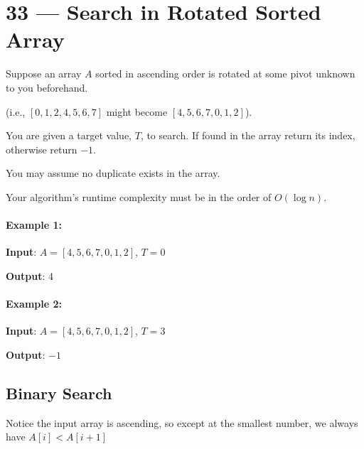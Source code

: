 \section{33 --- Search in Rotated Sorted Array}
Suppose an array $A$ sorted in ascending order is rotated at some pivot unknown to you beforehand.

(i.e., $[0,1,2,4,5,6,7]$ might become $[4,5,6,7,0,1,2]$).

You are given a target value, $T$, to search. If found in the array return its index, otherwise return $-1$.

You may assume no duplicate exists in the array.

Your algorithm's runtime complexity must be in the order of $ O(\log n)$.

\paragraph{Example 1:}

\begin{flushleft}
\textbf{Input}: $A = [4,5,6,7,0,1,2]$, $T = 0$

\textbf{Output}: 4
\end{flushleft}

\paragraph{Example 2:}

\begin{flushleft}
\textbf{Input}: $A = [4,5,6,7,0,1,2]$, $T = 3$

\textbf{Output}: $-1$

\end{flushleft}

\subsection{Binary Search}

Notice the input array is ascending, so except at the smallest number, we always have $A[i] < A[i+1]$

